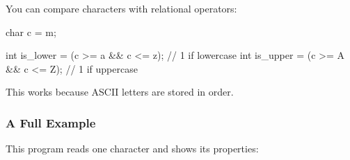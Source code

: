 \documentclass[
  letterpaper,
  DIV=11,
  numbers=noendperiod]{scrreprt}
\newenvironment{Shaded}{\begin{snugshade}}{\end{snugshade}}
\newcommand{\CharTok}[1]{\textcolor[rgb]{0.13,0.47,0.30}{#1}}
\newcommand{\CommentTok}[1]{\textcolor[rgb]{0.37,0.37,0.37}{#1}}
\newcommand{\DataTypeTok}[1]{\textcolor[rgb]{0.68,0.00,0.00}{#1}}
\newcommand{\NormalTok}[1]{\textcolor[rgb]{0.00,0.23,0.31}{#1}}
\newcommand{\OperatorTok}[1]{\textcolor[rgb]{0.37,0.37,0.37}{#1}}
\begin{document}
You can compare characters with relational operators:

\begin{Shaded}
\begin{Highlighting}[]
\DataTypeTok{char}\NormalTok{ c }\OperatorTok{=} \CharTok{\textquotesingle{}m\textquotesingle{}}\OperatorTok{;}

\DataTypeTok{int}\NormalTok{ is\_lower }\OperatorTok{=} \OperatorTok{(}\NormalTok{c }\OperatorTok{\textgreater{}=} \CharTok{\textquotesingle{}a\textquotesingle{}} \OperatorTok{\&\&}\NormalTok{ c }\OperatorTok{\textless{}=} \CharTok{\textquotesingle{}z\textquotesingle{}}\OperatorTok{);}  \CommentTok{// 1 if lowercase}
\DataTypeTok{int}\NormalTok{ is\_upper }\OperatorTok{=} \OperatorTok{(}\NormalTok{c }\OperatorTok{\textgreater{}=} \CharTok{\textquotesingle{}A\textquotesingle{}} \OperatorTok{\&\&}\NormalTok{ c }\OperatorTok{\textless{}=} \CharTok{\textquotesingle{}Z\textquotesingle{}}\OperatorTok{);}  \CommentTok{// 1 if uppercase}
\end{Highlighting}
\end{Shaded}

This works because ASCII letters are stored in order.

\subsubsection{A Full Example}\label{a-full-example-7}

This program reads one character and shows its properties:
\end{document}
